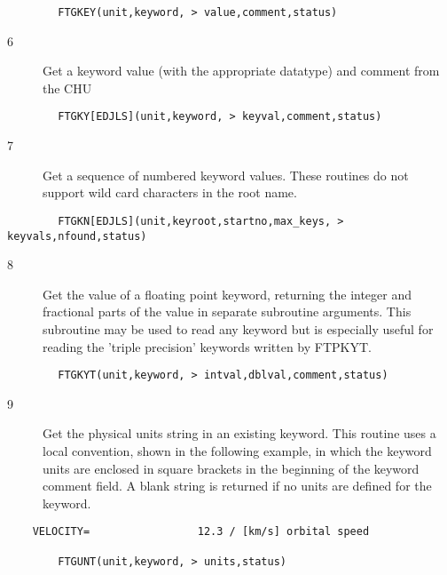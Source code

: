 \documentclass[11pt]{book}
\begin{document}
\begin{verbatim}
        FTGKEY(unit,keyword, > value,comment,status)
\end{verbatim}

\begin{description}
\item[6 ] Get a keyword value (with the appropriate datatype) and comment from
   the CHU
\end{description}

\begin{verbatim}
        FTGKY[EDJLS](unit,keyword, > keyval,comment,status)
\end{verbatim}

\begin{description}
\item[7 ] Get a sequence of numbered keyword values.  These
   routines do not support wild card characters in the root name.
\end{description}

\begin{verbatim}
        FTGKN[EDJLS](unit,keyroot,startno,max_keys, > keyvals,nfound,status)
\end{verbatim}

\begin{description}
\item[8 ] Get the value of a floating point keyword, returning the integer and
    fractional parts of the value in separate subroutine arguments.
    This subroutine may be used to read any keyword but is especially
   useful for reading the 'triple precision' keywords written by FTPKYT.
\end{description}

\begin{verbatim}
        FTGKYT(unit,keyword, > intval,dblval,comment,status)
\end{verbatim}

\begin{description}
\item[9 ] Get the physical units string in an existing keyword.  This
    routine uses a local convention, shown in the following example,
    in which the keyword units are
    enclosed in square brackets in the beginning of the keyword comment
    field.  A blank string is returned if no units are defined
    for the keyword.
\end{description}

\begin{verbatim}
    VELOCITY=                 12.3 / [km/s] orbital speed

        FTGUNT(unit,keyword, > units,status)
\end{verbatim}
\end{document}
